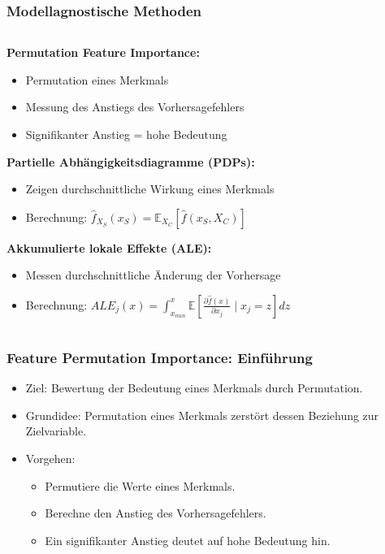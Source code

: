 \documentclass[aspectratio=1610, xcolor=dvipsnames, 9pt]{beamer}
\begin{document}
\begin{frame}
  \frametitle{Modellagnostische Methoden}
  \begin{columns}
    \begin{column}{1\textwidth}
      \textbf{Permutation Feature Importance:}
      \begin{itemize}
        \item Permutation eines Merkmals
        \item Messung des Anstiegs des Vorhersagefehlers
        \item Signifikanter Anstieg = hohe Bedeutung
      \end{itemize}
      \vspace{0.5cm}
      \textbf{Partielle Abhängigkeitsdiagramme (PDPs):}
      \begin{itemize}
        \item Zeigen durchschnittliche Wirkung eines Merkmals
        \item Berechnung: $\hat{f}_{X_S}(x_S) = \mathbb{E}_{X_C}[\hat{f}(x_S, X_C)]$
      \end{itemize}
      \vspace{0.5cm}
      \textbf{Akkumulierte lokale Effekte (ALE):}
      \begin{itemize}
        \item Messen durchschnittliche Änderung der Vorhersage
        \item Berechnung: $ALE_j(x) = \int_{x_{min}}^x \mathbb{E} \left[ \frac{\partial \hat{f}(x)}{\partial x_j} \mid x_j = z \right] dz$
      \end{itemize}
    \end{column}
  \end{columns}
\end{frame}

\begin{frame}
  \frametitle{Feature Permutation Importance: Einführung}
  \begin{itemize}
    \item Ziel: Bewertung der Bedeutung eines Merkmals durch Permutation.
    \item Grundidee: Permutation eines Merkmals zerstört dessen Beziehung zur Zielvariable.
    \item Vorgehen:
    \begin{itemize}
      \item Permutiere die Werte eines Merkmals.
      \item Berechne den Anstieg des Vorhersagefehlers.
      \item Ein signifikanter Anstieg deutet auf hohe Bedeutung hin.
    \end{itemize}
  \end{itemize}
\end{frame}
\end{document}
